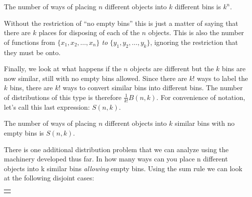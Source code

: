 \documentclass[10pt,]{book}
\theoremstyle{plain}
\theoremstyle{definition}
\theoremstyle{definition}
\numberwithin{equation}{chapter}
\newlength{\panelmax}
\begin{document}
\begin{assemblage}\label{assemblage-5}
\hypertarget{p-270}{}%
The number of ways of placing \(n\) different objects into \(k\) different bins is \(k^{n}\).%
\end{assemblage}
\hypertarget{p-271}{}%
Without the restriction of ``no empty bins'' this is just a matter of saying that there are \(k\) places for disposing of each of the \(n\) objects. This is also the number of functions from \(\{x_{1},x_{2},\ldots,x_{n}\}\) \emph{to} \(\{y_{1},y_{2},\ldots,y_{k}\}\), ignoring the restriction that they must be onto.%
\par
\hypertarget{p-272}{}%
Finally, we look at what happens if the \(n\) objects are different but the \(k\) bins are now similar, still with no empty bins allowed. Since there are \(k!\) ways to label the \(k\) bins, there are \(k!\) ways to convert similar bins into different bins. The number of distributions of this type is therefore \(\frac{1}{k!}B(n,k)\). For convenience of notation, let's call this last expression: \(S\left(n,k \right)\).%
\begin{assemblage}\label{assemblage-6}
\hypertarget{p-273}{}%
The number of ways of placing \(n\) different objects into \(k\) similar bins with no empty bins is \(S(n,k)\).%
\end{assemblage}
\hypertarget{p-274}{}%
There is one additional distribution problem that we can analyze using the machinery developed thus far. In how many ways can you place n different objects into k similar bins \emph{allowing} empty bins. Using the sum rule we can look at the following disjoint cases:%
{%
\setlength{\panelmax}{0pt}
\ifdefined\panelboxAtabular\else\newsavebox{\panelboxAtabular}\fi%
\ifdefined\phAtabular\else\newlength{\phAtabular}\fi%
\setlength{\phAtabular}{\ht\panelboxAtabular+\dp\panelboxAtabular}
\settototalheight{\phAtabular}{\usebox{\panelboxAtabular}}
\setlength{\panelmax}{\maxof{\panelmax}{\phAtabular}}
\leavevmode%
\setlength{\tabcolsep}{0\linewidth}
\par\medskip\noindent
\hspace*{0.25\linewidth}%
\begin{tabular}{@{}*{1}{c}@{}}
\begin{minipage}[c][\panelmax][t]{0.5\linewidth}\usebox{\panelboxAtabular}\end{minipage}\end{tabular}\\
}%
\end{document}
